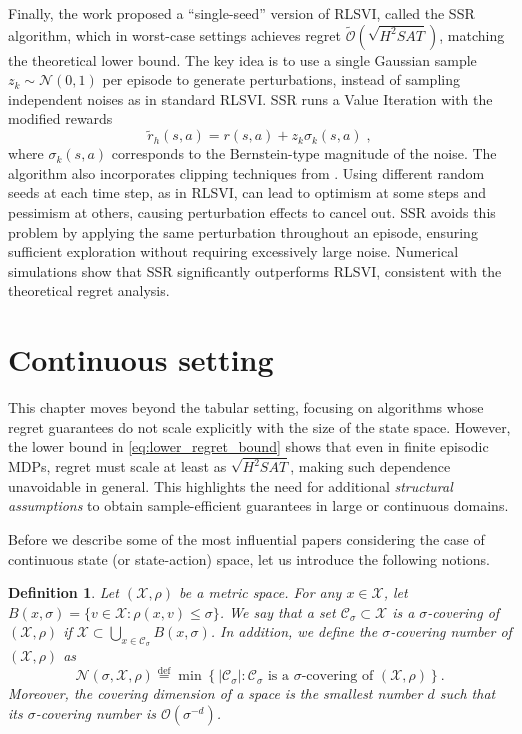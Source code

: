 \documentclass{article}
\numberwithin{equation}{section}
\newtheorem{definition}{Definition}
\newcommand{\eqsp}{\;}
\begin{document}
Finally, the work \cite{xiong2022near} proposed a “single-seed” version of RLSVI, called the SSR algorithm, which in worst-case settings achieves regret \(\widetilde{\mathcal{O}}(\sqrt{H^2SAT})\), matching the theoretical lower bound. The key idea is to use a single Gaussian sample \(z_k\sim\mathcal{N}(0,1)\) per episode to generate perturbations, instead of sampling independent noises as in standard RLSVI. SSR runs a Value Iteration with the modified rewards
\[\widetilde{r}_h(s,a) = r(s,a) + z_k\sigma_k(s,a)\eqsp,\]
where \(\sigma_k(s,a)\) corresponds to the Bernstein-type magnitude of the noise. The algorithm also incorporates clipping techniques from \cite{agrawal2021improved}. Using different random seeds at each time step, as in RLSVI, can lead to optimism at some steps and pessimism at others, causing perturbation effects to cancel out. SSR avoids this problem by applying the same perturbation throughout an episode, ensuring sufficient exploration without requiring excessively large noise. Numerical simulations show that SSR significantly outperforms RLSVI, consistent with the theoretical regret analysis.

\section{Continuous setting}
\label{s7}

This chapter moves beyond the tabular setting, focusing on algorithms whose regret guarantees do not scale explicitly with the size of the state space. However, the lower bound in \eqref{eq:lower_regret_bound} shows that even in finite episodic MDPs, regret must scale at least as $\sqrt{H^2SA T}$, making such dependence unavoidable in general. This highlights the need for additional \emph{structural assumptions} to obtain sample-efficient guarantees in large or continuous domains.

Before we describe some of the most influential papers considering the case of continuous state (or state-action) space, let us introduce the following notions.
\begin{definition}\label{def:cov_num}
    Let $(\mathcal{X}, \rho)$ be a metric space. For any $x \in \mathcal{X}$, let $B(x, \sigma)=\{v \in \mathcal{X}: \rho(x, v) \leq \sigma\}$. We say that a set $\mathcal{C}_\sigma \subset \mathcal{X}$ is a $\sigma$\textit{-covering} of $(\mathcal{X}, \rho)$ if $\mathcal{X} \subset \bigcup_{x \in \mathcal{C}_\sigma} B(x, \sigma)$. In addition, we define the $\sigma$\textit{-covering number} of $(\mathcal{X}, \rho)$ as
    \[
    \mathcal{N}(\sigma, \mathcal{X}, \rho) \stackrel{\text{def}}{=} \min \left\{\left|\mathcal{C}_\sigma\right|: \mathcal{C}_\sigma \text { is a } \sigma \text {-covering of }(\mathcal{X}, \rho)\right\} .
    \]
    Moreover, the \textit{covering dimension} of a space is the smallest number $d$ such that its $\sigma$-covering number is $\mathcal{O}\left(\sigma^{-d}\right)$.
\end{definition}
\end{document}
